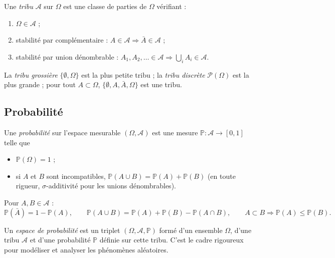 \documentclass[11pt,a4paper]{article}
\renewcommand{\P}{\mathbb{P}}
\newcommand{\A}{\mathcal{A}}
\newcommand{\1}{\mathbf{1}}
\begin{document}
\begin{definition}[Tribu]
Une \emph{tribu} $\A$ sur $\Omega$ est une classe de parties de $\Omega$ vérifiant :
\begin{enumerate}
  \item $\Omega\in\A$ ;
  \item stabilité par complémentaire : $A\in\A\Rightarrow\bar A\in\A$ ;
  \item stabilité par union dénombrable : $A_1,A_2,\dots\in\A\Rightarrow\bigcup_i A_i\in\A$.
\end{enumerate}
\end{definition}

\begin{exemple}
La \emph{tribu grossière} $\{\emptyset,\Omega\}$ est la plus petite tribu ; la \emph{tribu discrète} $\mathcal{P}(\Omega)$ est la plus grande ; pour tout $A\subset\Omega$, $\{\emptyset,A,\bar A,\Omega\}$ est une tribu.
\end{exemple}

\subsection{Probabilité}

\begin{definition}[Probabilité]
Une \emph{probabilité} sur l'espace mesurable $(\Omega,\A)$ est une mesure $\P:\A\to[0,1]$ telle que
\begin{itemize}
  \item $\P(\Omega)=1$ ;
  \item si $A$ et $B$ sont incompatibles, $\P(A\cup B)=\P(A)+\P(B)$ (en toute rigueur, $\sigma$-additivité pour les unions dénombrables).
\end{itemize}
\end{definition}

\begin{proposition}[Propriétés]
Pour $A,B\in\A$ :
\[
\P(\bar A)=1-\P(A),\qquad
\P(A\cup B)=\P(A)+\P(B)-\P(A\cap B),\qquad
A\subset B\Rightarrow\P(A)\le\P(B).
\]
\end{proposition}

\begin{definition}
Un \emph{espace de probabilité} est un triplet $(\Omega,\A,\P)$ formé d'un ensemble $\Omega$, d'une tribu $\A$ et d'une probabilité $\P$ définie sur cette tribu. C'est le cadre rigoureux pour modéliser et analyser les phénomènes aléatoires.
\end{definition}
\end{document}

